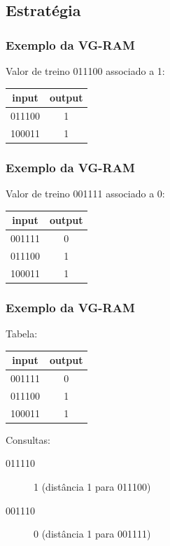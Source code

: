 \documentclass{beamer}
\begin{document}
\subsection{Estratégia}
\begin{frame}
    \frametitle{Exemplo da VG-RAM}
    Valor de treino 011100 associado a 1:
    \begin{table}
        \centering
        \begin{tabular}{|c|c|}
            \hline
            input &   output\\
            \hline
            011100 & \alert 1\\
            \hline
            100011 &        1\\
            \hline
        \end{tabular}
    \end{table}
\end{frame}
\begin{frame}
    \frametitle{Exemplo da VG-RAM}
    Valor de treino 001111 associado a 0:
    \begin{table}
        \centering
        \begin{tabular}{|c|c|}
            \hline
            input &   output\\
            \hline
            001111 & \alert 0\\
            \hline
            011100 &        1\\
            \hline
            100011 &        1\\
            \hline
        \end{tabular}
    \end{table}
\end{frame}
\begin{frame}
    \frametitle{Exemplo da VG-RAM}
    Tabela:
    \begin{table}
        \centering
        \begin{tabular}{|c|c|}
            \hline
            input &   output\\
            \hline
            001111 & 0\\
            \hline
            011100 & 1\\
            \hline
            100011 & 1\\
            \hline
        \end{tabular}

    \end{table}
    Consultas:
    \begin{description}
        \item[011110] 1 (distância 1 para 011100)
        \item[001110] 0 (distância 1 para 001111)
    \end{description}
\end{frame}
\end{document}

